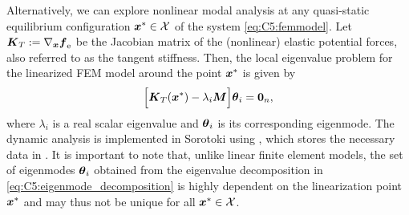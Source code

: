 Alternatively, we can explore nonlinear modal analysis at any quasi-static equilibrium configuration ${\boldsymbol{x}}^* \in \mathcal{X}$ of the system \eqref{eq:C5:femmodel}. Let ${\boldsymbol{K}}_T:= \nabla_{\boldsymbol{x}} {\boldsymbol{f}} _{\scriptstyle\textrm{e}}$ be the Jacobian matrix of the (nonlinear) elastic potential forces, also referred to as the tangent stiffness. Then, the local eigenvalue problem for the linearized FEM model around the point ${\boldsymbol{x}}^*$ is given by 
%
\begin{equation}
\Big[{\boldsymbol{K}}_T({\boldsymbol{x}}^*)- \lambda_i {\boldsymbol{M}} \Big] {\boldsymbol{\theta}}_i = \boldsymbol{0}_n,
\label{eq:C5:eigenmode_decomposition}
\end{equation}
%
where $\lambda_i$ is a real scalar eigenvalue and ${\boldsymbol{\theta}}_i$ is its corresponding eigenmode. The dynamic analysis is implemented in Sorotoki using , which stores the necessary data in . It is important to note that, unlike linear finite element models, the set of eigenmodes ${{\boldsymbol{\theta}}_i}$ obtained from the eigenvalue decomposition in \eqref{eq:C5:eigenmode_decomposition} is highly dependent on the linearization point ${\boldsymbol{x}}^*$ and may thus not be unique for all ${\boldsymbol{x}}^* \in \mathcal{X}$.


